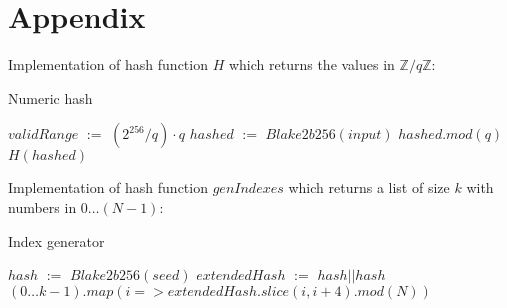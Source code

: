 \documentclass[]{article}
\def\Let#1#2{\State #1 $:=$ #2}
\begin{document}
    

    \section*{Appendix}
    \label{appendix}

    Implementation of hash function $H$ which returns the values in $\mathbb{Z}/q\mathbb{Z}$:

    \begin{algorithm}[H]
        \caption{Numeric hash}
        \label{alg:H}
        \begin{algorithmic}[1]
            \Let{$validRange$}{$(2^{256} / q) \cdot q$}
            \Let{$hashed$}{$Blake2b256(input)$}
            \State \Return $hashed.mod(q)$
            \Else
            \State \Return $H(hashed)$
            \EndIf
            \EndFunction
        \end{algorithmic}
    \end{algorithm}

    Implementation of hash function $genIndexes$ which returns a list of size $k$ with numbers in $0\dots (N-1)$:

    \begin{algorithm}[H]
        \caption{Index generator}
        \label{alg:genIndexes}
        \begin{algorithmic}[1]
            \Let{$hash$}{$Blake2b256(seed)$}
            \Let{$extendedHash$}{$hash||hash$}
            \State \Return $(0\dots{k-1}).map(i => extendedHash.slice(i,i+4).mod(N))$
            \EndFunction
        \end{algorithmic}
    \end{algorithm}
\end{document}
